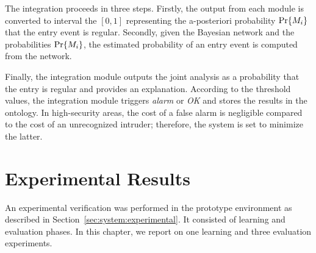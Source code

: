 The integration proceeds in three steps. Firstly, the output from each module is converted to interval the $[0, 1]$ representing the a-posteriori probability $\text{Pr}\{M_i\}$ that the entry event is regular. Secondly, given the Bayesian network and the probabilities $\text{Pr}\{M_i\}$, the estimated  probability of an entry event is computed from the network.

Finally, the integration module outputs the joint analysis as a probability that the entry is regular and provides an explanation. According to the threshold values, the integration module triggers \textit{alarm} or \textit{OK} and stores the results in the ontology. In high-security areas, the cost of a false alarm is negligible compared to the cost of an unrecognized intruder; therefore, the system is set to minimize the latter.



%
%

\section{Experimental Results}
\label{sec:results}
  



An experimental verification was performed in the prototype environment as described in Section~\ref{sec:system:experimental}. It consisted of learning and evaluation phases. In this chapter, we report on one learning and three evaluation experiments.

